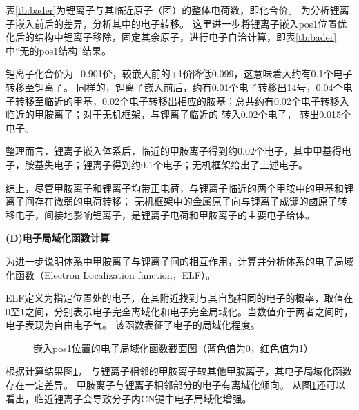表\ref{tb:bader}为锂离子与其临近原子（团）的整体电荷数，即化合价。
为分析锂离子嵌入前后的差异，分析其中的电子转移。
这里进一步将锂离子嵌入pos1位置优化后的结构中锂离子移除，固定其余原子，进行电子自洽计算，即表\ref{tb:bader}中“无的pos1结构”结果。

锂离子化合价为+0.901价，较嵌入前的+1价降低0.099，这意味着大约有0.1个电子转移至锂离子。
同样的，锂离子嵌入前后，约有0.01个电子转移出14号，0.04个电子转移至临近的甲基，0.02个电子转移出相应的胺基；总共约有0.02个电子转移入临近的甲胺离子；对于无机框架，与锂离子临近的 转入0.02个电子， 转出0.015个电子。

整理而言，锂离子嵌入体系后，临近的甲胺离子得到约0.02个电子，其中甲基得电子，胺基失电子；锂离子得到约0.1个电子；无机框架给出了上述电子。


综上，尽管甲胺离子和锂离子均带正电荷，与锂离子临近的两个甲胺中的甲基和锂离子间存在微弱的电荷转移；
无机框架中的金属原子向与锂离子成键的卤原子转移电子，间接地影响锂离子，是锂离子电荷和甲胺离子的主要电子给体。


{\bf (D)电子局域化函数计算}

为进一步说明体系中甲胺离子与锂离子间的相互作用，计算并分析体系的电子局域化函数（Electron Localization function，ELF）。

ELF定义为指定位置处的电子，在其附近找到与其自旋相同的电子的概率，取值在0至1之间，分别表示电子完全离域化和电子完全局域化。当数值介于两者之间时，电子表现为自由电子气。
该函数表征了电子的局域化程度。

\begin{figure}[htbp]
    \centering
    \caption{嵌入pos1位置的电子局域化函数截面图（蓝色值为0，红色值为1）}
    \label{fig:111-pos1-elf}
\end{figure}

根据计算结果图\ref{fig:111-pos1-elf}，
与锂离子相邻的甲胺离子较其他甲胺离子，其电子局域化函数存在一定差异。
甲胺离子与锂离子相邻部分的电子有离域化倾向。
从图\ref{fig:111-pos1-elf}还可以看出，临近锂离子会导致分子内CN键中电子局域化增强。


